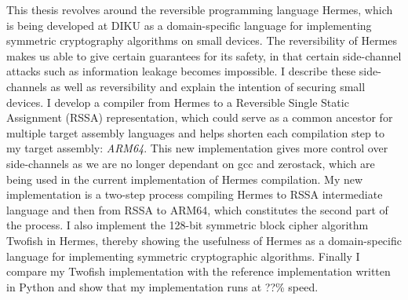 This thesis revolves around the reversible programming language Hermes, which is being developed at DIKU as a domain-specific language for implementing symmetric cryptography algorithms on small devices.
The reversibility of Hermes makes us able to give certain guarantees for its safety, in that certain side-channel attacks such as information leakage becomes impossible.
I describe these side-channels as well as reversibility and explain the intention of securing small devices.
I develop a compiler from Hermes to a Reversible Single Static Assignment (RSSA) representation, which could serve as a common ancestor for multiple target assembly languages and helps shorten each compilation step to my target assembly: \emph{ARM64}.
This new implementation gives more control over side-channels as we are no longer dependant on gcc and zerostack, which are being used in the current implementation of Hermes compilation.
My new implementation is a two-step process compiling Hermes to RSSA intermediate language and then from RSSA to ARM64, which constitutes the second part of the process.
I also implement the 128-bit symmetric block cipher algorithm Twofish in Hermes, thereby showing the usefulness of Hermes as a domain-specific language for implementing symmetric cryptographic algorithms.
Finally I compare my Twofish implementation with the reference implementation written in Python and show that my implementation runs at ??\% speed.
